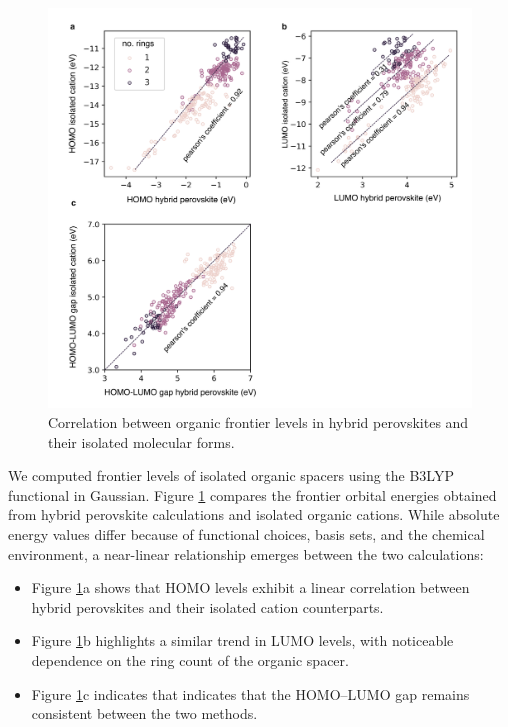 \begin{figure}[htbp]
    \centering
    \includegraphics[width=\textwidth]{figures/HT-ML/figure4-9.png}
    \caption{Correlation between organic frontier levels in hybrid perovskites and their isolated molecular forms.}
    \label{fig:figure4.9}
\end{figure}

We computed frontier levels of isolated organic spacers using the B3LYP functional in Gaussian. Figure \ref{fig:figure4.9} compares the frontier orbital energies obtained from hybrid perovskite calculations and isolated organic cations. While absolute energy values differ because of functional choices, basis sets, and the chemical environment, a near-linear relationship emerges between the two calculations:

\begin{itemize}
    \item Figure \ref{fig:figure4.9}a shows that HOMO levels exhibit a linear correlation between hybrid perovskites and their isolated cation counterparts.
    \item Figure \ref{fig:figure4.9}b highlights a similar trend in LUMO levels, with noticeable dependence on the ring count of the organic spacer.
    \item Figure \ref{fig:figure4.9}c indicates that indicates that the HOMO–LUMO gap remains consistent between the two methods.
    
\end{itemize}

